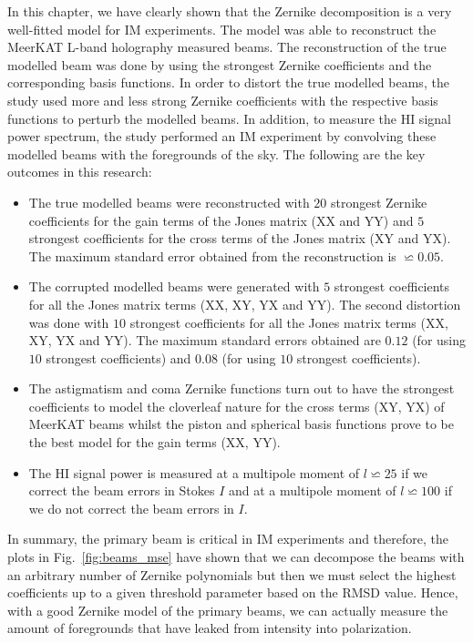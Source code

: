 In this chapter, we have clearly shown that the Zernike decomposition is a very well-fitted model for IM experiments. The model was able to reconstruct
the MeerKAT L-band holography measured beams. The reconstruction of the true modelled beam was done by using the strongest Zernike coefficients and the corresponding
basis functions. In order to distort the true modelled beams, the study used more and less strong Zernike coefficients with the respective basis functions
to perturb the modelled beams. In addition, to measure the HI signal power spectrum, the study performed an IM experiment by convolving these modelled beams 
with the foregrounds of the sky. The following are the key outcomes in this research:

\begin{itemize}
\item The true modelled beams were reconstructed with $20$ strongest Zernike coefficients for the gain terms of the Jones matrix (XX and YY) and 
$5$ strongest coefficients for the cross terms of the Jones matrix (XY and YX). The maximum standard error obtained from the reconstruction is $\backsimeq 0.05$.

\item The corrupted modelled beams were generated with $5$ strongest coefficients for all the Jones matrix terms (XX, XY, YX and YY). The second distortion was done
with $10$ strongest coefficients for all the Jones matrix terms (XX, XY, YX and YY). The maximum  standard errors obtained are $0.12$ (for using $10$ strongest coefficients)
and  $0.08$ (for using $10$ strongest coefficients).

\item The astigmatism and coma Zernike functions turn out to have the strongest coefficients to model the cloverleaf nature for the cross terms (XY, YX) of MeerKAT beams whilst 
the piston and spherical basis functions prove to be the best model for the gain terms (XX, YY). 


\item The HI signal power is measured at a multipole moment of $l \backsimeq 25$ if we correct the beam errors in Stokes $I$ and at a multipole moment of $l \backsimeq 100$ if we do not correct the beam errors in $I$. 
\end{itemize}

\noindent  In summary,  the primary beam is critical in IM experiments and therefore, the plots in Fig.~\ref{fig:beams_mse} have shown that we can decompose the beams with an arbitrary number of Zernike polynomials but then we must select the highest coefficients up to a given threshold parameter based on the RMSD value. Hence, with a good Zernike model of the primary beams, we can actually measure the amount of foregrounds that have leaked from intensity into polarization.

